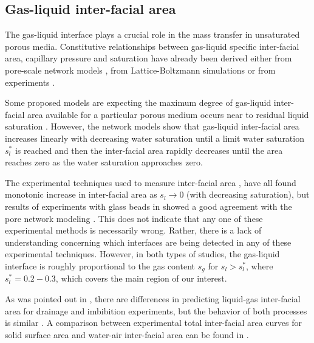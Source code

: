 \documentclass[a4paper,12pt]{article}
\newcommand{\Sl}{\mbox{$s_l\xspace$}}
\newcommand{\Sls}{\mbox{$s_l^*\xspace$}}
\newcommand{\Sg}{\mbox{$s_g\xspace$}}
\begin{document}
\subsection*{Gas-liquid inter-facial area}

The gas-liquid interface
plays a crucial role in the mass transfer in unsaturated porous
media. Constitutive relationships between gas-liquid specific
inter-facial area, capillary pressure and saturation have already been
derived either from pore-scale network models \cite{Cary1994,
Niemet2002, Anwar2008, Gvirtzman1991, Reeves1996, Joekar-Niasar2007,
Held2001}, from Lattice-Boltzmann simulations \cite{Ahrenholz2011} or
from experiments \cite{Brusseau1997, Chen2006, Culligan2004,
FaisalAnwar2000, Kim1999, Schaefer2000, Porter2010}.

Some proposed models are expecting the maximum degree of gas-liquid
inter-facial area available for a particular porous medium occurs near
to residual liquid saturation \cite{Cary1994, Niemet2002,
Gvirtzman1991, Anwar2008}. However, the network models
\cite{Reeves1996, Held2001, Joekar-Niasar2007} show that gas-liquid
inter-facial area increases linearly with decreasing water saturation
until a limit water saturation $\Sls$ is reached and then the
inter-facial area rapidly decreases until the area reaches zero as the
water saturation approaches zero.

The experimental techniques used to measure inter-facial area
\cite{Chen2006, FaisalAnwar2000, Kim1999, Schaefer2000}, have all
found monotonic increase in inter-facial area as $\Sl \rightarrow 0$
(with decreasing saturation), but results of experiments with glass
beads in \cite{Culligan2004, Porter2010} showed a good agreement with
the pore network modeling \cite{Reeves1996}. This does not indicate
that any one of these experimental methods is necessarily
wrong. Rather, there is a lack of understanding concerning which
interfaces are being detected in any of these experimental
techniques. However, in both types of studies, the gas-liquid
interface is roughly proportional to the gas content $\Sg$ for
$\Sl>\Sls$, where $\Sls=0.2-0.3$, which covers the main region of our
interest.

As was pointed out in \cite{Porter2010}, there are differences in
predicting liquid-gas inter-facial area for drainage and imbibition
experiments, but the behavior of both processes is similar
\cite{Culligan2004}. A comparison between experimental total
inter-facial area curves for solid surface area and water-air
inter-facial area can be found in \cite{Porter2010}.
\end{document}
